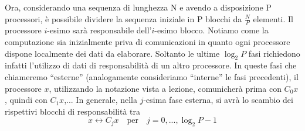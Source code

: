 \documentclass[12pt,a4paper,oneside,openright]{article}
\begin{document}
Ora, considerando una sequenza di lunghezza N e avendo a disposizione P processori, è possibile dividere la sequenza iniziale in P blocchi da $\frac{N}{P}$ elementi. Il processore $i$-esimo sarà responsabile dell'$i$-esimo blocco. Notiamo come la computazione sia inizialmente priva di comunicazioni in quanto ogni processore dispone localmente dei dati da elaborare. Soltanto le ultime $\log_{2} P$ fasi richiedono infatti l'utilizzo di dati di responsabilità di un altro processore. In queste fasi che chiameremo ``esterne'' (analogamente consideriamo ``interne'' le fasi precedenti), il processore $x$, utilizzando la notazione vista a lezione, comunicherà prima con $C_{0}x$, quindi con $C_{1}x$,...
In generale, nella $j$-esima fase esterna, si avrà lo scambio dei rispettivi blocchi di responsabilità tra
$$x  \longleftrightarrow  C_{j}x \quad \textrm{per} \quad j=0,...,\log_{2} P-1 $$
\end{document}
